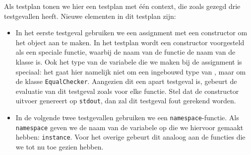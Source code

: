 Als testplan tonen we hier een testplan met één context, die zoals gezegd drie testgevallen heeft.
Nieuwe elementen in dit testplan zijn:

\begin{itemize}
    \item In het eerste testgeval gebruiken we een assignment met een constructor om het object aan te maken.
    In het testplan wordt een constructor voorgesteld als een speciale functie, waarbij de naam van de functie de naam van de klasse is.
    Ook het type van de variabele die we maken bij de assignment is speciaal: het gaat hier namelijk niet om een ingebouwd type van \tested{}, maar om de klasse \texttt{EqualChecker}.
    Aangezien dit een apart testgeval is, gebeurt de evaluatie van dit testgeval zoals voor elke functie.
    Stel dat de constructor uitvoer genereert op \texttt{stdout}, dan zal dit testgeval fout gerekend worden.
    \item In de volgende twee testgevallen gebruiken we een \texttt{namespace}-functie.
    Als \texttt{namespace} geven we de naam van de variabele op die we hiervoor gemaakt hebben: \texttt{instance}.
    Voor het overige gebeurt dit analoog aan de functies die we tot nu toe gezien hebben.
\end{itemize}

\inputminted{json}{sources/equal-plan.tson}